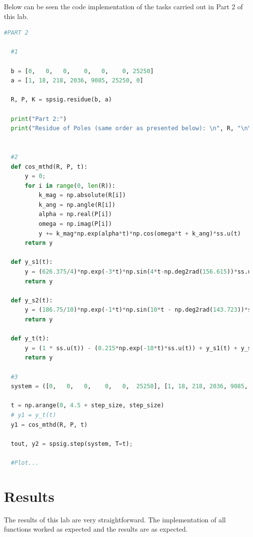 \documentclass[12pt]{report}
\begin{document}
Below can be seen the code implementation of the tasks carried out in Part 2 of this lab.
\begin{lstlisting}[language=Python, basicstyle=\footnotesize]
  #PART 2

  #1

  b = [0,   0,   0,    0,   0,    0, 25250]
  a = [1, 18, 218, 2036, 9085, 25250, 0]

  R, P, K = spsig.residue(b, a)

  print("Part 2:")
  print("Residue of Poles (same order as presented below): \n", R, "\n\nPoles in ascending order of mag.:\n", P, "\n\nCoefficent of Direct Polynomial Term: \n", K)


  #2
  def cos_mthd(R, P, t):
      y = 0;
      for i in range(0, len(R)):
          k_mag = np.absolute(R[i])
          k_ang = np.angle(R[i])
          alpha = np.real(P[i])
          omega = np.imag(P[i])
          y += k_mag*np.exp(alpha*t)*np.cos(omega*t + k_ang)*ss.u(t)
      return y

  def y_s1(t):
      y = (626.375/4)*np.exp(-3*t)*np.sin(4*t-np.deg2rad(156.615))*ss.u(t)
      return y
      
  def y_s2(t):
      y = (186.75/10)*np.exp(-1*t)*np.sin(10*t - np.deg2rad(143.723))*ss.u(t)
      return y

  def y_t(t):
      y = (1 * ss.u(t)) - (0.215*np.exp(-10*t)*ss.u(t)) + y_s1(t) + y_s2(t)
      return y

  #3
  system = ([0,   0,   0,    0,   0,  25250], [1, 18, 218, 2036, 9085, 25250])

  t = np.arange(0, 4.5 + step_size, step_size)
  # y1 = y_t(t) 
  y1 = cos_mthd(R, P, t)       

  tout, y2 = spsig.step(system, T=t);

  #Plot...
\end{lstlisting}

\section{Results}\label{section: Results}
The results of this lab are very straightforward. The implementation of all functions worked as expected and the results are as expected.
\end{document}

